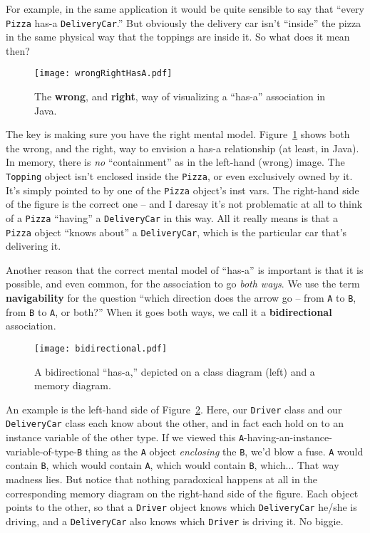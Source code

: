For example, in the same application it would be quite sensible to say that
``every \texttt{Pizza} has-a \texttt{DeliveryCar}.'' But obviously the delivery
car isn't ``inside'' the pizza in the same physical way that the toppings are
inside it. So what does it mean then?

\begin{figure}[ht]
\centering
\texttt{[image: wrongRightHasA.pdf]}   %
\caption{The \textbf{wrong}, and \textbf{right}, way of visualizing a ``has-a''
association in Java.}
\label{fig:wrongRightHasA}
\end{figure}

The key is making sure you have the right mental model.
Figure~\ref{fig:wrongRightHasA} shows both the wrong, and the right, way to
envision a has-a relationship (at least, in Java). In memory, there is
\textit{no} ``containment'' as in the left-hand (wrong) image. The
\texttt{Topping} object isn't enclosed inside the \texttt{Pizza}, or even
exclusively owned by it. It's simply pointed to by one of the \texttt{Pizza}
object's inst vars. The right-hand side of the figure is the correct one --
and I daresay it's not problematic at all to think of a \texttt{Pizza}
``having'' a \texttt{DeliveryCar} in this way. All it really means is that a
\texttt{Pizza} object ``knows about'' a \texttt{DeliveryCar}, which is the
particular car that's delivering it.

Another reason that the correct mental model of ``has-a'' is important is that
it is possible, and even common, for the association to go \textit{both ways}.
We use the term \textbf{navigability} for the question ``which direction does
the arrow go -- from \texttt{A} to \texttt{B}, from \texttt{B} to \texttt{A},
or both?'' When it goes both ways, we call it a \textbf{bidirectional}
association.

\begin{figure}[ht]
\centering
\texttt{[image: bidirectional.pdf]}   %
\caption{A bidirectional ``has-a,'' depicted on a class diagram (left) and a
memory diagram.}
\label{fig:bidirectional}
\end{figure}

An example is the left-hand side of Figure~\ref{fig:bidirectional}. Here, our
\texttt{Driver} class and our \texttt{DeliveryCar} class each know about the
other, and in fact each hold on to an instance variable of the other type. If
we viewed this \texttt{A}-having-an-instance-variable-of-type-\texttt{B} thing
as the \texttt{A} object \textit{enclosing} the \texttt{B}, we'd blow a fuse.
\texttt{A} would contain \texttt{B}, which would contain \texttt{A}, which
would contain \texttt{B}, which... That way madness lies. But notice that
nothing paradoxical happens at all in the corresponding memory diagram on the
right-hand side of the figure. Each object points to the other, so that a
\texttt{Driver} object knows which \texttt{DeliveryCar} he/she is driving, and
a \texttt{DeliveryCar} also knows which \texttt{Driver} is driving it. No
biggie.

